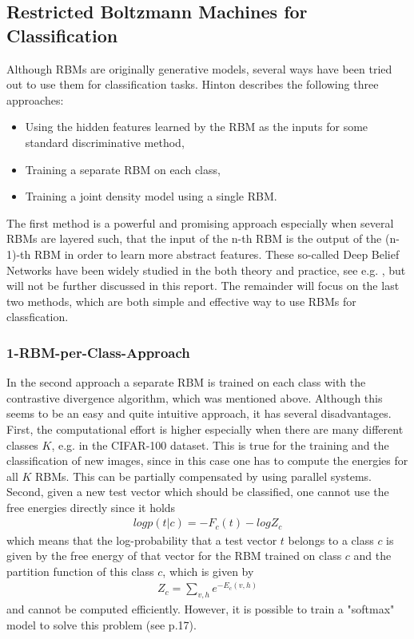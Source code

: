 \documentclass[a4paper]{scrartcl}
\begin{document}
\subsection{Restricted Boltzmann Machines for Classification}
Although RBMs are originally generative models, several ways have been tried out to use them for classification tasks. Hinton \cite{Hinton} describes the following three approaches:
\begin{itemize}
    \item Using the hidden features learned by the RBM as the inputs for some standard discriminative method,
    \item Training a separate RBM on each class,
	\item Training a joint density model using a single RBM.
\end{itemize}
The first method is a powerful and promising approach especially when several RBMs are layered such, that the input of the n-th RBM is the output of the (n-1)-th RBM in order to learn more abstract features. These so-called Deep Belief Networks have been widely studied in the both theory and practice, see e.g. \cite{DeepBelief}, but will not be further discussed in this report. The remainder will focus on the last two methods, which are both simple and effective way to use RBMs for classfication. 

\subsubsection{1-RBM-per-Class-Approach}
In the second approach a separate RBM is trained on each class with the contrastive divergence algorithm, which was mentioned above. Although this seems to be an easy and quite intuitive approach, it has several disadvantages. First, the computational effort is higher especially when there are many different classes $K$, e.g. in the CIFAR-100 dataset. This is true for the training and the classification of new images, since in this case one has to compute the energies for all $K$ RBMs. This can be partially compensated by using parallel systems. Second, given a new test vector which should be classified, one cannot use the free energies directly since it holds
\begin{align*}
log p(t|c) = -F_c(t) - log Z_c
\end{align*}
which means that the log-probability that a test vector $t$ belongs to a class $c$ is given by the free energy of that vector for the RBM trained on class $c$ and the partition function of this class $c$, which is given by
\begin{align}
Z_c = \sum_{v,h} e^{-E_c(v,h)}
\end{align}
and cannot be computed efficiently. However, it is possible to train a "softmax" model to solve this problem (see \cite{Hinton} p.17).
\end{document}
